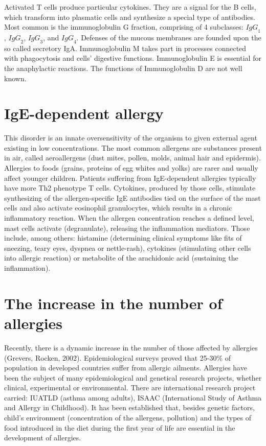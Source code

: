 \documentclass[10pt,oneside]{memoir}
\begin{document}
Activated T cells produce particular cytokines. They are a signal for the B cells, which transform into plasmatic cells and synthesize a special type of antibodies. Most common is the immunoglobulin G fraction, comprising of 4 subclasses: $ I{gG}_{1}$, $ I{gG}_{2}$, $ I{gG}_{3}$, and $ I{gG}_{4}$. Defenses of the mucous membranes are founded upon the so called secretory IgA. Immunoglobulin M takes part in processes connected with phagocytosis and cells' digestive functions. Immunoglobulin E is essential for the anaphylactic reactions. The functions of Immunoglobulin D are not well known.


\chapter{IgE-dependent allergy}
\label{ige-dependentallergy}

This disorder is an innate oversensitivity of the organism to given external agent existing in low concentrations. The most common allergens are substances present in air, called aeroallergens (dust mites, pollen, molds, animal hair and epidermis). Allergies to foods (grains, proteins of egg whites and yolks) are rarer and usually affect younger children. Patients suffering from IgE-dependent allergies typically have more Th2 phenotype T cells. Cytokines, produced by those cells, stimulate synthesizing of the allergen-specific IgE antibodies tied on the surface of the mast cells and also activate eosinophil granulocytes, which results in a chronic inflammatory reaction. When the allergen concentration reaches a defined level, mast cells activate (degranulate), releasing the inflammation mediators. Those include, among others: histamine (determining clinical symptoms like fits of sneezing, teary eyes, dyspnea or nettle-rash), cytokines (stimulating other cells into allergic reaction) or metabolite of the arachidonic acid (sustaining the inflammation).


\chapter{The increase in the number of allergies}
\label{theincreaseinthenumberofallergies}

Recently, there is a dynamic increase in the number of those affected by allergies (Grevers, Rocken, 2002). Epidemiological surveys proved that 25-30\% of population in developed countries suffer from allergic ailments. Allergies have been the subject of many epidemiological and genetical research projects, whether clinical, experimental or environmental.
There are international research project carried: IUATLD (asthma among adults), ISAAC (International Study of Asthma and Allergy in Childhood). It has been established that, besides genetic factors, child's environment (concentration of the allergens, pollution) and the types of food introduced in the diet during the first year of life are essential in the development of allergies.
\end{document}
